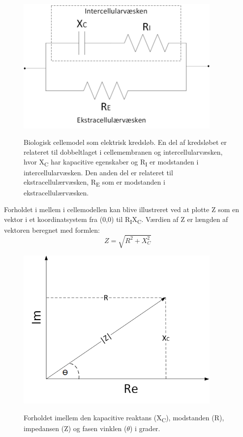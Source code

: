 \begin{figure}[H]
\centering
{\includegraphics[width=10cm]
{Figure/vaevsmodel}}
\caption{Biologisk cellemodel som elektrisk kredsløb. En del af kredsløbet er relateret til dobbeltlaget i cellemembranen og intercellularvæsken, hvor X\textsubscript{C} har kapacitive egenskaber og R\textsubscript{I} er modstanden i intercellularvæsken. Den anden del er relateret til ekstracellulærvæsken, R\textsubscript{E} som er modstanden i ekstracellulærvæsken.}
\label{fig:vaevsmodel}
\end{figure}

Forholdet i mellem i cellemodellen kan blive illustreret ved at plotte Z som en vektor i et koordinatsystem fra (0,0) til R\textsubscript{I}X\textsubscript{C}. Værdien af Z er længden af vektoren beregnet med formlen: 
\begin{equation}
Z=\sqrt{R^{2}+X^{2}_{C}}
\end{equation} 

\begin{figure}[H]
\centering
{\includegraphics[width=10cm]
{Figure/vektor}}
\caption{Forholdet imellem den kapacitive reaktans (X\textsubscript{C}), modstanden (R), impedansen (Z) og fasen vinklen ($\theta$) i grader.}
\label{fig:vektor}
\end{figure}


